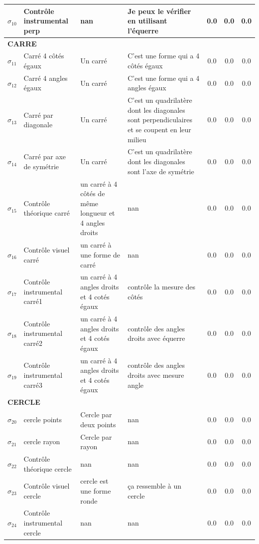 \begin{longtable}{|c|p{3cm}|p{4cm}|p{4cm}|c|c|c|}
$\sigma_{10}$\label{cont_inst_perp} & Contrôle instrumental perp & nan & Je peux le vérifier en utilisant l’équerre & 0.0 & 0.0 & 0.0 \\ \hline
\multicolumn{7}{|l|}{\textbf{CARRE}} \\ \hline
$\sigma_{11}$\label{cont_carre_cote} & Carré 4 côtés égaux & Un carré & C'est une forme qui a 4 côtés égaux & 0.0 & 0.0 & 0.0 \\ \hline
$\sigma_{12}$\label{cont_carre_angle} & Carré 4 angles égaux & Un carré & C'est une forme qui a 4 angles égaux & 0.0 & 0.0 & 0.0 \\ \hline
$\sigma_{13}$\label{cont_carre_diag} & Carré par diagonale & Un carré & C'est un quadrilatère dont les diagonales sont perpendiculaires et se coupent en leur milieu & 0.0 & 0.0 & 0.0 \\ \hline
$\sigma_{14}$\label{cont_carre_sym} & Carré par axe de symétrie & Un carré & C'est un quadrilatère dont les diagonales sont l'axe de symétrie & 0.0 & 0.0 & 0.0 \\ \hline
$\sigma_{15}$\label{cont_theo_carr} & Contrôle théorique carré & un carré à 4 côtés de même longueur et 4 angles droits & nan & 0.0 & 0.0 & 0.0 \\ \hline
$\sigma_{16}$\label{cont_visu_carr} & Contrôle visuel carré & un carré à une forme de carré & nan & 0.0 & 0.0 & 0.0 \\ \hline
$\sigma_{17}$\label{cont_inst_carr1} & Contrôle instrumental carré1 & un carré à 4 angles droits et 4 cotés égaux & contrôle la mesure des côtés & 0.0 & 0.0 & 0.0 \\ \hline
$\sigma_{18}$\label{cont_inst_carr2} & Contrôle instrumental carré2 & un carré à 4 angles droits et 4 cotés égaux & contrôle des angles droits avec équerre & 0.0 & 0.0 & 0.0 \\ \hline
$\sigma_{19}$\label{cont_inst_carr3} & Contrôle instrumental carré3 & un carré à 4 angles droits et 4 cotés égaux & contrôle des angles droits avec mesure angle & 0.0 & 0.0 & 0.0 \\ \hline
\multicolumn{7}{|l|}{\textbf{CERCLE}} \\ \hline
$\sigma_{20}$\label{cont_cercle_point} & cercle points & Cercle par deux points & nan & 0.0 & 0.0 & 0.0 \\ \hline
$\sigma_{21}$\label{cont_cercle_rayon} & cercle rayon & Cercle par rayon & nan & 0.0 & 0.0 & 0.0 \\ \hline
$\sigma_{22}$\label{cont_theo_cerc} & Contrôle théorique cercle & nan & nan & 0.0 & 0.0 & 0.0 \\ \hline
$\sigma_{23}$\label{cont_visu_cerc} & Contrôle visuel cercle & cercle est une forme ronde & ça ressemble à un cercle & 0.0 & 0.0 & 0.0 \\ \hline
$\sigma_{24}$\label{cont_inst_cerc} & Contrôle instrumental cercle & nan & nan & 0.0 & 0.0 & 0.0 \\ \hline
\end{longtable}

